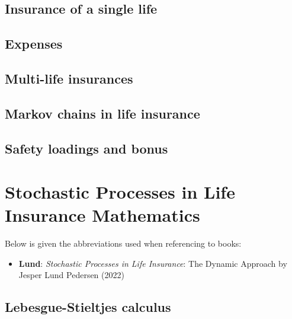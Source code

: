 \documentclass[a4paper,12pt,openany]{book}
\providecommand{\tightlist}{%
 \setlength{\itemsep}{0pt}\setlength{\parskip}{0pt}}
\begin{document}
\hypertarget{insurance-of-a-single-life}{%
\section{Insurance of a single life}\label{insurance-of-a-single-life}}

\hypertarget{expenses}{%
\section{Expenses}\label{expenses}}

\hypertarget{multi-life-insurances}{%
\section{Multi-life insurances}\label{multi-life-insurances}}

\hypertarget{markov-chains-in-life-insurance}{%
\section{Markov chains in life insurance}\label{markov-chains-in-life-insurance}}

\hypertarget{safety-loadings-and-bonus}{%
\section{Safety loadings and bonus}\label{safety-loadings-and-bonus}}

\hypertarget{stochastic-processes-in-life-insurance-mathematics}{%
\chapter{Stochastic Processes in Life Insurance Mathematics}\label{stochastic-processes-in-life-insurance-mathematics}}

Below is given the abbreviations used when referencing to books:

\begin{itemize}
\tightlist
\item
  \textbf{Lund}: \emph{Stochastic Processes in Life Insurance}: The Dynamic Approach by Jesper Lund Pedersen (2022)\cite{lund2022}
\end{itemize}

\hypertarget{lebesgue-stieltjes-calculus}{%
\section{Lebesgue-Stieltjes calculus}\label{lebesgue-stieltjes-calculus}}
\end{document}
